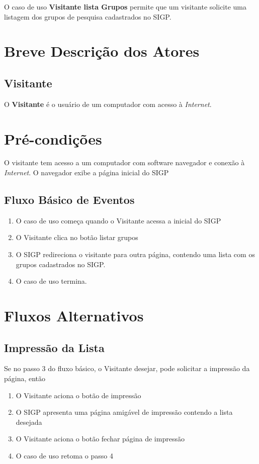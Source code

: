 \documentclass[11pt, a4paper,oneside]{book}
\begin{document}
O caso de uso \textbf{Visitante lista Grupos} permite que um visitante solicite uma listagem dos grupos de pesquisa cadastrados no SIGP.

\section{Breve Descrição dos Atores}

\subsection{Visitante}

O \textbf{Visitante} é o usuário de um computador com acesso à \emph{Internet}.

\section{Pré-condições}
O visitante tem acesso a um computador com software navegador e conexão à \emph{Internet}.
O navegador exibe a página inicial do SIGP

\subsection{Fluxo Básico de Eventos}

\begin{enumerate}
\item O caso de uso começa quando o Visitante acessa a inicial do SIGP
\item O Visitante clica no botão listar grupos
\item O SIGP redireciona o visitante para outra página, contendo uma lista com os grupos cadastrados no SIGP.
\item O caso de uso termina.
\end{enumerate}

\section{Fluxos Alternativos}

\subsection{Impressão da Lista}
Se no passo $3$ do fluxo básico, o Visitante desejar, pode solicitar a impressão da página, então

\begin{enumerate}
\item O Visitante aciona o botão de impressão
\item O SIGP apresenta uma página amigável de impressão contendo a lista desejada
\item O Visitante aciona o botão fechar página de impressão
\item O caso de uso retoma o passo 4
\end{enumerate}
\end{document}
